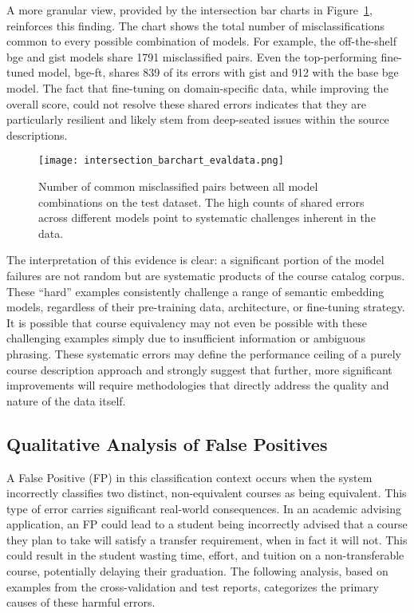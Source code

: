 A more granular view, provided by the intersection bar charts in Figure~\ref{fig:intersection_barchart}, reinforces this finding. The chart shows the total number of misclassifications common to every possible combination of models. For example, the off-the-shelf bge and gist models share 1791 misclassified pairs. Even the top-performing fine-tuned model, bge-ft, shares 839 of its errors with gist and 912 with the base bge model. The fact that fine-tuning on domain-specific data, while improving the overall score, could not resolve these shared errors indicates that they are particularly resilient and likely stem from deep-seated issues within the source descriptions.
\begin{figure}[tb]
\centering
\texttt{[image: intersection\_barchart\_evaldata.png]}
\caption{Number of common misclassified pairs between all model combinations on the test dataset. The high counts of shared errors across different models point to systematic challenges inherent in the data.}
\label{fig:intersection_barchart}
\end{figure}

The interpretation of this evidence is clear: a significant portion of the model failures are not random but are systematic products of the course catalog corpus. These ``hard'' examples consistently challenge a range of semantic embedding models, regardless of their pre-training data, architecture, or fine-tuning strategy.  It is possible that course equivalency may not even be possible with these challenging examples simply due to insufficient information or ambiguous phrasing. These systematic errors may define the performance ceiling of a purely course description approach and strongly suggest that further, more significant improvements will require methodologies that directly address the quality and nature of the data itself.

\subsection{Qualitative Analysis of False Positives}
A False Positive (FP) in this classification context occurs when the system incorrectly classifies two distinct, non-equivalent courses as being equivalent. This type of error carries significant real-world consequences. In an academic advising application, an FP could lead to a student being incorrectly advised that a course they plan to take will satisfy a transfer requirement, when in fact it will not. This could result in the student wasting time, effort, and tuition on a non-transferable course, potentially delaying their graduation. The following analysis, based on examples from the cross-validation and test reports, categorizes the primary causes of these harmful errors.

